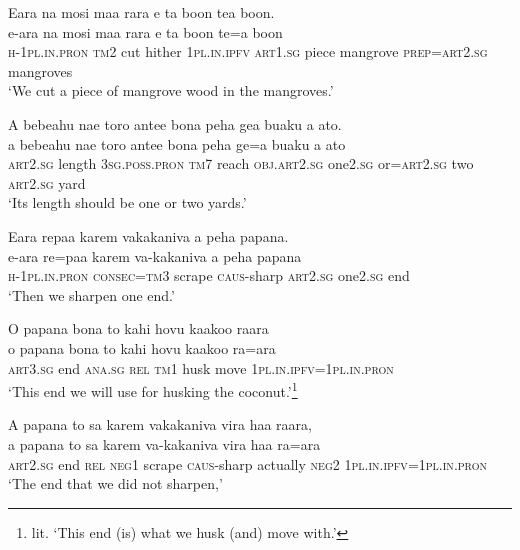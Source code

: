 \ea\label{ex:text01-53}
Eara na mosi maa rara e ta boon tea boon.\\
\gll e-ara	na	mosi	maa	rara	e	ta	boon	te=a	boon\\
     \textsc{h}-1\textsc{pl}.\textsc{in}.\textsc{pron}	\textsc{tm}2	cut	hither	1\textsc{pl}.\textsc{in}.\textsc{ipfv}	\textsc{art}1.\textsc{sg}	piece	mangrove	\textsc{prep}=\textsc{art}2.\textsc{sg}	mangroves\\
\glt `We cut a piece of mangrove wood in the mangroves.'
\z

\ea\label{ex:text01-54}
A bebeahu nae toro antee bona peha gea buaku a ato.\\
\gll a	bebeahu	nae	toro	antee	bona	peha	ge=a	buaku	a	ato\\
     \textsc{art}2.\textsc{sg}	length	3\textsc{sg}.\textsc{poss}.\textsc{pron}	\textsc{tm}7	reach	\textsc{obj}.\textsc{art}2.\textsc{sg}	one2.\textsc{sg}	or=\textsc{art}2.\textsc{sg}	two	\textsc{art}2.\textsc{sg}	yard\\
\glt `Its length should be one or two yards.'
\z

\ea\label{ex:text01-55}
Eara repaa karem vakakaniva a peha papana.\\
\gll e-ara	re=paa	karem	va-kakaniva	a	peha	papana\\
     \textsc{h}-1\textsc{pl}.\textsc{in}.\textsc{pron}	\textsc{consec}=\textsc{tm}3	scrape	\textsc{caus}-sharp	\textsc{art}2.\textsc{sg}	one2.\textsc{sg}	end\\
\glt `Then we sharpen one end.'
\z

\ea\label{ex:text01-56}
O papana bona to kahi hovu kaakoo raara\\
\gll o	papana	bona	to	kahi	hovu	kaakoo	ra=ara\\
     \textsc{art}3.\textsc{sg}	end	\textsc{ana}.\textsc{sg}	\textsc{rel}	\textsc{tm}1	husk	move	1\textsc{pl}.\textsc{in}.\textsc{ipfv}=1\textsc{pl}.\textsc{in}.\textsc{pron}\\
\glt `This end we will use for husking the coconut.'\footnote{lit. `This end (is) what we husk (and) move with.'}
\z

\ea\label{ex:text01-57}
A papana to sa karem vakakaniva vira haa raara,\\
\gll a	papana	to	sa	karem	va-kakaniva	vira	haa	ra=ara\\
     \textsc{art}2.\textsc{sg}	end	\textsc{rel}	\textsc{neg}1	scrape	\textsc{caus}-sharp	actually	\textsc{neg}2	1\textsc{pl}.\textsc{in}.\textsc{ipfv}=1\textsc{pl}.\textsc{in}.\textsc{pron}\\
\glt `The end that we did not sharpen,'
\z

